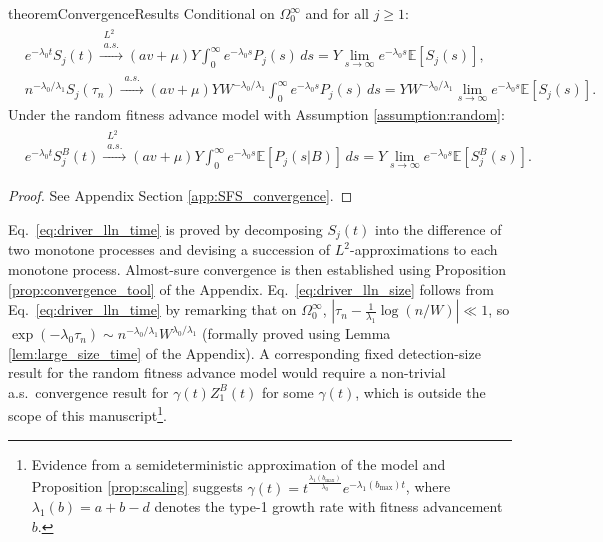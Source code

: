 \documentclass{article}
\numberwithin{equation}{section}
\begin{document}
\begin{restatable}{theorem}{ConvergenceResults} \label{prop:convergence_results}Conditional on $\Omega_0^\infty$ and for all $j\geq 1$:
  \begin{align}
    &e^{-\lambda_0 t}S_j(t)\overset{\substack{L^2\\a.s.}}{\to}(av+\mu)Y\int_0^\infty e^{-\lambda_0 s}P_j(s)\,ds=Y\lim_{s\to\infty}e^{-\lambda_0 s}\mathbb{E}[S_j(s)],\label{eq:driver_lln_time}\\
    &n^{-\lambda_0/\lambda_1}S_j(\tau_n)\overset{\substack{a.s.}}{\to}(av+\mu)YW^{-\lambda_0/\lambda_1}\int_0^\infty e^{-\lambda_0 s}P_j(s)\,ds=YW^{-\lambda_0/\lambda_1}\lim_{s\to \infty}e^{-\lambda_0 s}\mathbb{E}[S_j(s)].\label{eq:driver_lln_size}
  \end{align}
  Under the random fitness advance model with Assumption \ref{assumption:random}:
  \begin{align*}
    &e^{-\lambda_0 t}S_j^B(t)\overset{\substack{L^2\\a.s.}}{\to}(av+\mu)Y\int_0^\infty e^{-\lambda_0 s}\mathbb{E}[P_j(s|B)]\,ds=Y\lim_{s\to\infty}e^{-\lambda_0 s} \mathbb{E}[S_j^B(s)].
  \end{align*}
\end{restatable}
\begin{proof}
  See Appendix Section \ref{app:SFS_convergence}.
\end{proof}

Eq.~\ref{eq:driver_lln_time} is proved by decomposing $S_j(t)$ into the difference of two monotone processes and devising a succession of $L^2$-approximations to each monotone process. Almost-sure convergence is then established using Proposition \ref{prop:convergence_tool} of the Appendix. Eq.~\ref{eq:driver_lln_size} follows from Eq.~\ref{eq:driver_lln_time} by remarking that on $\Omega_0^\infty$, $|\tau_n-\frac{1}{\lambda_1}\log\left(n/W\right)|\ll 1$, so $\exp(-\lambda_0 \tau_n)\sim n^{-\lambda_0/\lambda_1}W^{\lambda_0/\lambda_1}$ (formally proved using Lemma \ref{lem:large_size_time} of the Appendix). A corresponding fixed detection-size result for the random fitness advance model would require a non-trivial a.s.~convergence result for $\gamma(t)Z_1^B(t)$ for some $\gamma(t)$, which is outside the scope of this manuscript\footnote{Evidence from a semideterministic approximation of the model \cite{durrettfoo2010} and Proposition \ref{prop:scaling} suggests $\gamma(t)=t^{\frac{\lambda_1(b_{\max})}{\lambda_0}}e^{-\lambda_1(b_{\max})t}$, where $\lambda_1(b)=a+b-d$ denotes the type-1 growth rate with fitness advancement $b$.}.
\end{document}
